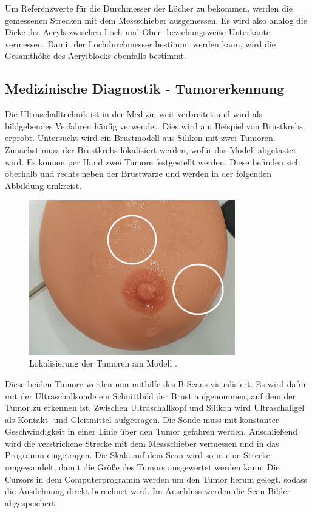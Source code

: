 \noindent Um Referenzwerte für die Durchmesser der Löcher zu bekommen, werden die gemessenen Strecken 
mit dem Messschieber ausgemessen. Es wird also analog die Dicke des Acryls zwischen Loch und Ober- 
beziehungsweise Unterkante vermessen. Damit der Lochdurchmesser bestimmt werden kann, wird die 
Gesamthöhe des Acrylblocks ebenfalls bestimmt. 


\subsection{Medizinische Diagnostik - Tumorerkennung}
Die Ultraschalltechnik ist in der Medizin weit verbreitet und wird als bildgebendes Verfahren häufig 
verwendet. Dies wird am Beispiel von Brustkrebs erprobt. Untersucht wird ein Brustmodell aus Silikon 
mit zwei Tumoren. Zunächst muss der Brustkrebs lokalisiert werden, wofür das Modell abgetastet wird. 
Es können per Hand zwei Tumore festgestellt werden. Diese befinden sich oberhalb und rechts neben 
der Brustwarze und werden in der folgenden Abbildung umkreist. 

\begin{figure}[H]
    \centering
    \includegraphics[width = 0.8\textwidth]{content/Tumororientierung2.jpg}
    \caption{Lokalisierung der Tumoren am Modell \cite{Versuchsanleitung_US2}.}
    \label{fig:Acrylblock}
\end{figure}
 
\noindent Diese beiden Tumore werden nun mithilfe des B-Scans visualisiert. Es wird dafür mit der 
Ultraschallsonde ein Schnittbild der Brust aufgenommen, auf dem der Tumor zu erkennen ist. Zwischen 
Ultraschallkopf und Silikon wird Ultraschallgel als Kontakt- und Gleitmittel aufgetragen. Die Sonde 
muss mit konstanter Geschwindigkeit in einer Linie über den Tumor gefahren werden. Anschließend wird 
die verstrichene Strecke mit dem Messschieber vermessen und in das Programm eingetragen. Die Skala 
auf dem Scan wird so in eine Strecke umgewandelt, damit die Größe des Tumors ausgewertet werden kann.
Die Cursors in dem Computerprogramm werden um den Tumor herum gelegt, sodass die Ausdehnung direkt 
berechnet wird. Im Anschluss werden die Scan-Bilder abgespeichert. 


